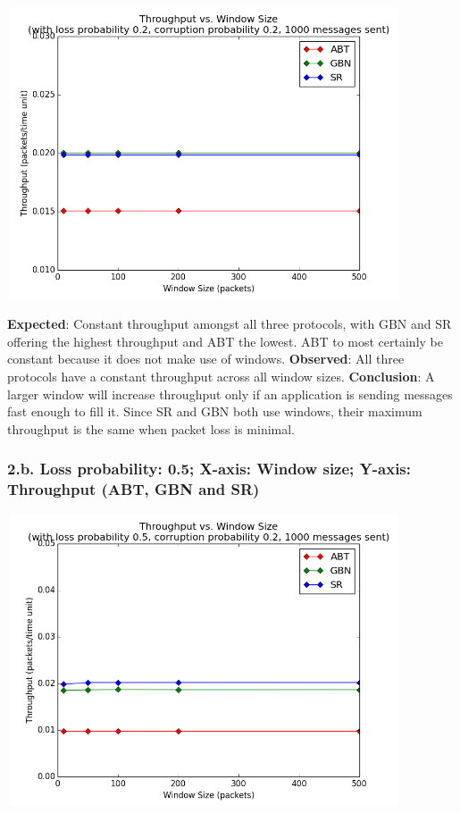 \documentclass{article}
\begin{document}
\begin{center}
    \includegraphics[width=330pt,height=245pt]{images/exp2g1.png}
\end{center}

\textbf{Expected}: Constant throughput amongst all three protocols, with GBN and SR offering the highest throughput and ABT the lowest. ABT to most certainly be constant because it does not make use of windows.
\newline\newline
\textbf{Observed}: All three protocols have a constant throughput across all window sizes.
\newline\newline
\textbf{Conclusion}: A larger window will increase throughput only if an application is sending messages fast enough to fill it. Since SR and GBN both use windows, their maximum throughput is the same when packet loss is minimal.

\pagebreak

\subsubsection{2.b. Loss probability: 0.5; X-axis: Window size; Y-axis: Throughput (ABT, GBN and SR)}

\begin{center}
    \includegraphics[width=330pt,height=245pt]{images/exp2g2.png}
\end{center}
\end{document}
